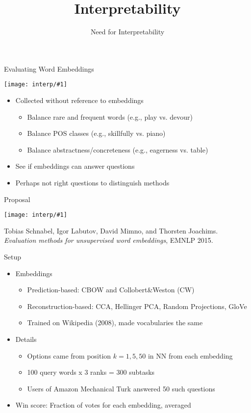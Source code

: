 \documentclass[compress]{beamer}
\title{Interpretability}
\date{Need for Interpretability}
\newcommand{\gfx}[2]{
\begin{center}
	\texttt{[image: interp/\#1]}
\end{center}
}
\begin{document}

\begin{frame}{Evaluating Word Embeddings}

  \gfx{sim-mc}{.8}
  \begin{itemize}
    \item Collected without reference to embeddings
      \begin{itemize}
\item Balance rare and frequent words (e.g., play vs. devour)
\item Balance POS classes (e.g., skillfully vs. piano)
\item Balance abstractness/concreteness (e.g., eagerness vs. table)
      \end{itemize}
    \item See if embeddings can answer questions
    \item Perhaps not right questions to distinguish methods
  \end{itemize}

\end{frame}

\begin{frame}{Proposal}

\gfx{schnabel-compare}{1.0}

Tobias Schnabel, Igor Labutov, David Mimno, and Thorsten Joachims.  \textit{Evaluation methods for unsupervised word embeddings}, EMNLP 2015.

\end{frame}

\begin{frame}{Setup}

\begin{itemize}
\item Embeddings
\begin{itemize}
\item Prediction-based: CBOW and Collobert\&Weston (CW)
\item Reconstruction-based: CCA, Hellinger PCA, Random Projections, GloVe
\item Trained on Wikipedia (2008), made vocabularies the same
\end{itemize}
\item Details
\begin{itemize}
\item Options came from position $k = 1, 5, 50$ in NN from each embedding
\item 100 query words x 3 ranks = 300 subtasks
\item Users of Amazon Mechanical Turk answered 50 such questions
\end{itemize}
\item Win score: Fraction of votes for each embedding, averaged
\end{itemize}

\end{frame}
\end{document}
